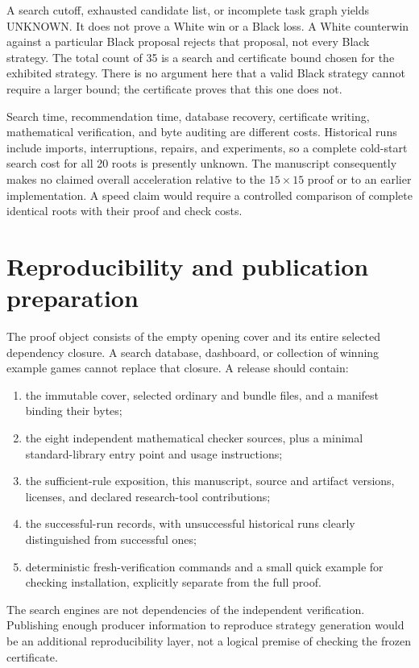 \documentclass[11pt]{article}
\theoremstyle{definition}
\theoremstyle{remark}
\begin{document}
A search cutoff, exhausted candidate list, or incomplete task graph yields
UNKNOWN. It does not prove a White win or a Black loss. A White counterwin
against a particular Black proposal rejects that proposal, not every Black
strategy. The total count of 35 is a search and certificate bound chosen
for the exhibited strategy. There is no argument here that a valid Black
strategy cannot require a larger bound; the certificate proves that this
one does not.

Search time, recommendation time, database recovery, certificate writing,
mathematical verification, and byte auditing are different costs.
Historical runs include imports, interruptions, repairs, and experiments,
so a complete cold-start search cost for all 20 roots is presently unknown.
The manuscript consequently makes no claimed overall acceleration relative
to the $15\times15$ proof or to an earlier implementation. A speed claim
would require a controlled comparison of complete identical roots with
their proof and check costs.

\section{Reproducibility and publication preparation}
\label{sec:repro}
The proof object consists of the empty opening cover and its entire selected
dependency closure. A search database, dashboard, or collection of winning
example games cannot replace that closure. A release should contain:
\begin{enumerate}
\item the immutable cover, selected ordinary and bundle files, and a
 manifest binding their bytes;
\item the eight independent mathematical checker sources, plus a minimal
 standard-library entry point and usage instructions;
\item the sufficient-rule exposition, this manuscript, source and artifact
 versions, licenses, and declared research-tool contributions;
\item the successful-run records, with unsuccessful historical runs clearly
 distinguished from successful ones;
\item deterministic fresh-verification commands and a small quick example
 for checking installation, explicitly separate from the full proof.
\end{enumerate}
The search engines are not dependencies of the independent verification.
Publishing enough producer information to reproduce strategy generation
would be an additional reproducibility layer, not a logical premise of
checking the frozen certificate.
\end{document}
